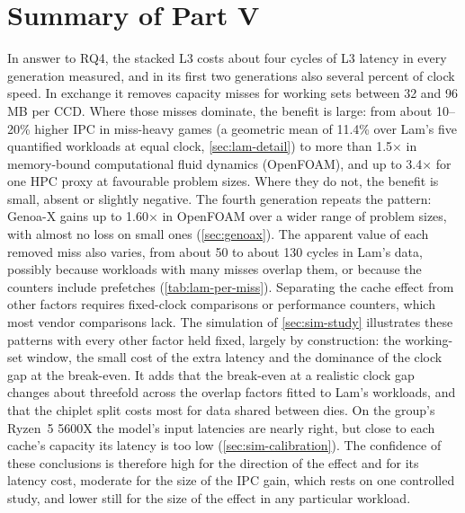 \section{Summary of Part V}
In answer to RQ4, the stacked L3 costs about four cycles of L3 latency in every generation measured, and in its first two generations also several percent of clock speed. In exchange it removes capacity misses for working sets between 32 and 96\,MB per CCD. Where those misses dominate, the benefit is large: from about 10--20\% higher IPC in miss-heavy games (a geometric mean of 11.4\% over Lam's five quantified workloads at equal clock, \cref{sec:lam-detail}) to more than 1.5$\times$ in memory-bound computational fluid dynamics (OpenFOAM), and up to 3.4$\times$ for one HPC proxy at favourable problem sizes. Where they do not, the benefit is small, absent or slightly negative. The fourth generation repeats the pattern: Genoa-X gains up to 1.60$\times$ in OpenFOAM over a wider range of problem sizes, with almost no loss on small ones (\cref{sec:genoax}). The apparent value of each removed miss also varies, from about 50 to about 130 cycles in Lam's data, possibly because workloads with many misses overlap them, or because the counters include prefetches (\cref{tab:lam-per-miss}). Separating the cache effect from other factors requires fixed-clock comparisons or performance counters, which most vendor comparisons lack. The simulation of \cref{sec:sim-study} illustrates these patterns with every other factor held fixed, largely by construction: the working-set window, the small cost of the extra latency and the dominance of the clock gap at the break-even. It adds that the break-even at a realistic clock gap changes about threefold across the overlap factors fitted to Lam's workloads, and that the chiplet split costs most for data shared between dies. On the group's Ryzen~5 5600X the model's input latencies are nearly right, but close to each cache's capacity its latency is too low (\cref{sec:sim-calibration}). The confidence of these conclusions is therefore high for the direction of the effect and for its latency cost, moderate for the size of the IPC gain, which rests on one controlled study, and lower still for the size of the effect in any particular workload.

